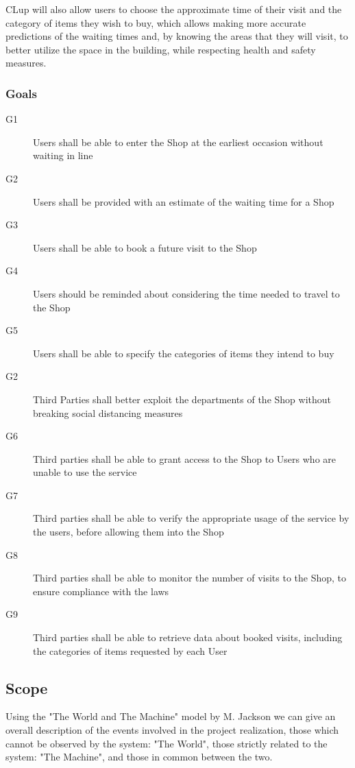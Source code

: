 CLup will also allow users to choose the approximate time of their visit and the category of items they wish to buy, which allows making more accurate predictions of the waiting times and, by knowing the areas that they will visit, to better utilize the space in the building, while respecting health and safety measures.

\subsubsection{Goals}

\begin{description}
    \item [G1]  Users shall be able to enter the Shop at the earliest occasion without waiting in line
    \item [G2]  Users shall be provided with an estimate of the waiting time for a Shop
    \item [G3]  Users shall be able to book a future visit to the Shop
    \item [G4]  Users should be reminded about considering the time needed to travel to the Shop
    \item [G5]  Users shall be able to specify the categories of items they intend to buy
    
    \item [G2]  Third Parties shall better exploit the departments of the Shop without breaking social distancing measures
    \item [G6]  Third parties shall be able to grant access to the Shop to Users who are unable to use the service
    \item [G7]  Third parties shall be able to verify the appropriate usage of the service by the users, before allowing them into the Shop
    \item [G8]  Third parties shall be able to monitor the number of visits to the Shop, to ensure compliance with the laws
    \item [G9] Third parties shall be able to retrieve data about booked visits, including the categories of items requested by each User

\end{description}
\subsection{Scope}

Using the "The World and The Machine" model by M. Jackson we can give an overall description of the events involved in the project realization, those which cannot be observed by the system: "The World", those strictly related to the system: "The Machine", and those in common between the two.

